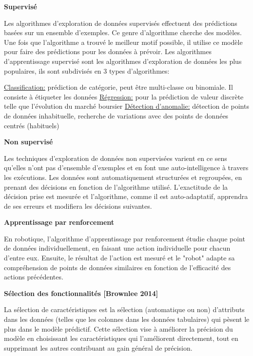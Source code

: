 \documentclass[12pt]{article}
\begin{document}
{%
\textbf{Supervisé}

Les algorithmes d'exploration de données supervisés effectuent des prédictions basées sur un ensemble d'exemples. Ce genre d'algorithme cherche des modèles. Une fois que l'algorithme a trouvé le meilleur motif possible, il utilise ce modèle pour faire des prédictions pour les données à prévoir.
Les algorithmes d'apprentissage supervisé sont les algorithmes d'exploration de données les plus populaires, ils sont subdivisés en 3 types d'algorithmes:
\begin{outline}
\1 \underline{Classification:} prédiction de catégorie, peut être multi-classe ou binomiale. Il consiste à étiqueter les données
\1 \underline{Régression:} pour la prédiction de valeur discrète telle que l'évolution du marché boursier
\1 \underline{Détection d'anomalie:} détection de points de données inhabituelle, recherche de variations avec des points de données centrés (habituels)
\end{outline}
\textbf{Non supervisé}

Les techniques d'exploration de données non supervisées varient en ce sens qu'elles n'ont pas d'ensemble d'exemples et en font une auto-intelligence à travers les exécutions. Les données sont automatiquement structurées et regroupées, en prenant des décisions en fonction de l'algorithme utilisé. L'exactitude de la décision prise est mesurée et l'algorithme, comme il est auto-adaptatif, apprendra de ses erreurs et modifiera les décisions suivantes.

\textbf{Apprentissage par renforcement}

En robotique, l'algorithme d'apprentissage par renforcement étudie chaque point de données individuellement, en faisant une action individuelle pour chacun d'entre eux. Ensuite, le résultat de l'action est mesuré et le "robot" adapte sa compréhension de points de données similaires en fonction de l'efficacité des actions précédentes.

\textbf{Sélection des fonctionnalités {\color{red}[Brownlee 2014]}}

La sélection de caractéristiques est la sélection (automatique ou non) d'attributs dans les données (telles que les colonnes dans les données tabulaires) qui pèsent le plus dans le modèle prédictif.
Cette sélection vise à améliorer la précision du modèle en choisissant les caractéristiques qui l'améliorent directement, tout en supprimant les autres contribuant au gain général de précision.

}
\end{document}
